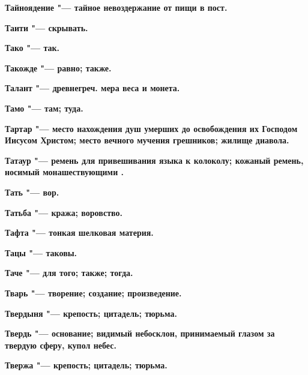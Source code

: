 \begin{mymulticols}{2}
\bfseries Тайноядение\normalfont{} "--- тайное невоздержание от пищи в пост. 




\bfseries Таити\normalfont{} "--- скрывать. 




\bfseries Тако\normalfont{} "--- так. 




\bfseries Такожде\normalfont{} "--- равно; также. 




\bfseries Талант\normalfont{} "--- древнегреч. мера веса и монета. 




\bfseries Тамо\normalfont{} "--- там; туда. 




\bfseries Тартар\normalfont{} "--- место нахождения душ умерших до освобождения их Господом Иисусом Христом; место вечного мучения грешников; жилище диавола. 




\bfseries Татаур\normalfont{} "--- ремень для привешивания языка к колоколу; кожаный ремень, носимый монашествующими . 




\bfseries Тать\normalfont{} "--- вор. 




\bfseries Татьба\normalfont{} "--- кража; воровство. 




\bfseries Тафта\normalfont{} "--- тонкая шелковая материя. 




\bfseries Тацы\normalfont{} "--- таковы. 




\bfseries Таче\normalfont{} "--- для того; также; тогда. 




\bfseries Тварь\normalfont{} "--- творение; создание; произведение. 




\bfseries Твердыня\normalfont{} "--- крепость; цитадель; тюрьма. 




\bfseries Твердь\normalfont{} "--- основание; видимый небосклон, принимаемый глазом за твердую сферу, купол небес. 




\bfseries Твержа\normalfont{} "--- крепость; цитадель; тюрьма. 





\end{mymulticols}
